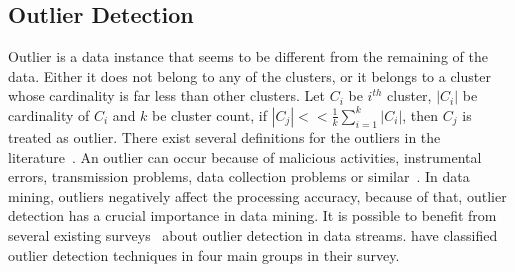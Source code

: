 \documentclass[smallcondensed]{svjour3}     %
\begin{document}
\subsection{Outlier Detection}
\label{subsec:outlierDetection}
Outlier is a data instance that seems to be different from the remaining of the data. Either it does not belong to any of the clusters, or it belongs to a cluster whose cardinality is far less than other clusters. Let $C_i$ be $i^{th}$ cluster, $|C_i|$ be cardinality of $C_i$ and $k$ be cluster count, if $|C_j| << \frac {1} {k} {\sum_{i=1}^{k} |C_i|}$, then $C_j$ is treated as outlier. There exist several definitions for the outliers in the literature~\citep{Modi2017OutlierAA}. An outlier can occur because of malicious activities, instrumental errors, transmission problems, data collection problems or similar~\citep{Merino2015}. In data mining, outliers negatively affect the processing accuracy, because of that, outlier detection has a crucial importance in data mining. It is possible to benefit from several existing surveys~\citep{Modi2017OutlierAA, Chauhan2015outlier, Souiden2016outlier, Thakkar2016outlier, Bhosale2014outlier, Sadik:2014outlier} about outlier detection in data streams. 
\citet{Thakkar2016outlier} have classified outlier detection techniques in four main groups in their survey.
\end{document}
